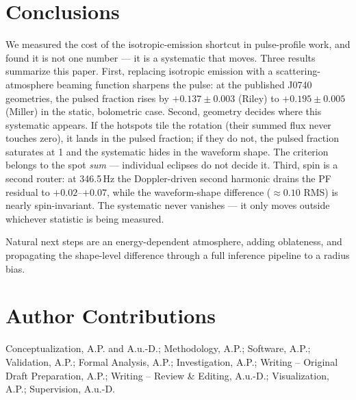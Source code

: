 \documentclass[twocolumn]{aastex701}
\begin{document}
\section{Conclusions} \label{sec:conclusions}
We measured the cost of the isotropic-emission shortcut in pulse-profile work, and found it
is not one number --- it is a systematic that moves. Three results summarize this paper.
First, replacing isotropic emission with a scattering-atmosphere beaming function sharpens
the pulse: at the published J0740 geometries, the pulsed fraction rises by $+0.137 \pm
0.003$ (Riley) to $+0.195 \pm 0.005$ (Miller) in the static, bolometric case. Second,
geometry decides where this systematic appears. If the hotspots tile the rotation (their
summed flux never touches zero), it lands in the pulsed fraction; if they do not, the pulsed
fraction saturates at 1 and the systematic hides in the waveform shape. The criterion
belongs to the spot \emph{sum} --- individual eclipses do not decide it. Third, spin is a
second router: at 346.5\,Hz the Doppler-driven second harmonic drains the PF residual to
$+0.02$--$+0.07$, while the waveform-shape difference ($\approx 0.10$ RMS) is nearly
spin-invariant. The systematic never vanishes --- it only moves outside whichever statistic
is being measured.

Natural next steps are an energy-dependent atmosphere, adding oblateness, and propagating
the shape-level difference through a full inference pipeline to a radius bias.


\section*{Author Contributions}
Conceptualization, A.P. and A.u.-D.; Methodology, A.P.; Software, A.P.;
Validation, A.P.; Formal Analysis, A.P.; Investigation, A.P.;
Writing -- Original Draft Preparation, A.P.; Writing -- Review \&
Editing, A.u.-D.; Visualization, A.P.; Supervision, A.u.-D.
\end{document}
